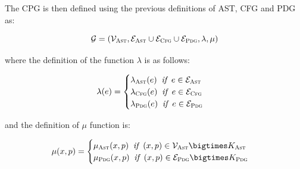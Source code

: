 The CPG is then defined using the previous definitions of AST, CFG and PDG as: 

\begin{equation*}
    \mathcal{G} = ( \mathcal{V}_{\textsc{Ast}}, \mathcal{E}_{\textsc{Ast}} \cup \mathcal{E}_{\textsc{Cfg}} \cup \mathcal{E}_{\textsc{Pdg}}, \lambda, \mu )
\end{equation*}

\newpage
where the definition of the function $\lambda$ is as follows:

  \begin{equation*}
      \lambda(e) = 
      \begin{cases} 
      \lambda_{\textsc{Ast}} (e) \;\; \textit{if} \;\; e \in \mathcal{E}_{\textsc{Ast}} \\
      \lambda_{\textsc{Cfg}} (e) \;\; \textit{if} \;\; e \in \mathcal{E}_{\textsc{Cfg}} \\
      \lambda_{\textsc{Pdg}} (e) \;\; \textit{if} \;\; e \in \mathcal{E}_{\textsc{Pdg}} 
   \end{cases}
  \end{equation*}

and the definition of $\mu$ function is:
  
  \begin{equation*}
      \mu(x, p) = 
      \begin{cases} 
      \mu_{\textsc{Ast}} (x, p) \;\; \textit{if} \;\; (x, p) \in \mathcal{V}_{\textsc{Ast}} \bigtimes K_{\textsc{Ast}} \\
      \mu_{\textsc{Pdg}} (x, p) \;\; \textit{if} \;\; (x, p) \in \mathcal{E}_{\textsc{Pdg}} \bigtimes K_{\textsc{Pdg}} \\
   \end{cases}
  \end{equation*}

